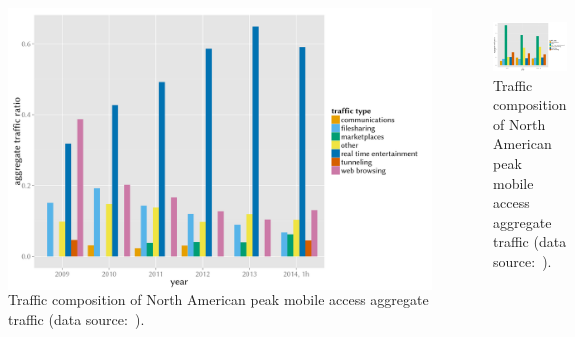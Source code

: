 \documentclass{beamer}
\begin{document}
\begin{frame}
\begin{figure}
	\begin{columns}[T]
		\centering
		\includegraphics[width=0.9\columnwidth]{../../chapters/01-intro/images/r-netvine-phenomena-fixed.pdf}
		\caption{Traffic composition of North American peak fixed access aggregate traffic (data source:~\cite{sandvine_internetphenomena}).}
		\begin{figure}
			\centering
			\includegraphics[width=0.9\columnwidth]{../../chapters/01-intro/images/r-netvine-phenomena-mobile.pdf}
			\caption{Traffic composition of North American peak mobile access aggregate traffic (data source:~\cite{sandvine_internetphenomena}).}
		\end{figure}
	\end{columns}

\end{figure}
\end{frame}
\end{document}
